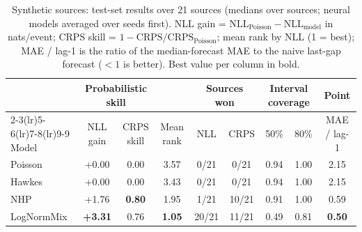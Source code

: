 \begin{table}[t]
\centering\small
\caption{Synthetic sources: test-set results over 21 sources (medians over sources; neural models averaged over seeds first). NLL gain = $\mathrm{NLL}_{\text{Poisson}} - \mathrm{NLL}_{\text{model}}$ in nats/event; CRPS skill = $1-\mathrm{CRPS}/\mathrm{CRPS}_{\text{Poisson}}$; mean rank by NLL (1 = best); MAE / lag-1 is the ratio of the median-forecast MAE to the naive last-gap forecast ($<1$ is better). Best value per column in bold.}
\label{tab:scoreboard-syn}
\begin{tabular}{lcccccccc}
\toprule
 & \multicolumn{2}{c}{Probabilistic skill} & & \multicolumn{2}{c}{Sources won} & \multicolumn{2}{c}{Interval coverage} & Point \\
\cmidrule(lr){2-3}\cmidrule(lr){5-6}\cmidrule(lr){7-8}\cmidrule(lr){9-9}
Model & NLL gain & CRPS skill & Mean rank & NLL & CRPS & 50\% & 80\% & MAE / lag-1 \\
\midrule
Poisson & +0.00 & 0.00 & 3.57 & 0/21 & 0/21 & 0.94 & 1.00 & 2.15 \\
Hawkes & +0.00 & 0.00 & 3.43 & 0/21 & 0/21 & 0.94 & 1.00 & 2.15 \\
NHP & +1.76 & \textbf{0.80} & 1.95 & 1/21 & 10/21 & 0.91 & 1.00 & 0.59 \\
LogNormMix & \textbf{+3.31} & 0.76 & \textbf{1.05} & 20/21 & 11/21 & 0.49 & 0.81 & \textbf{0.50} \\
\bottomrule
\end{tabular}
\end{table}
